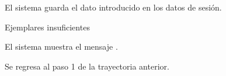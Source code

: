 {\begin{trayectoriaAlternativa}
    \item El sistema guarda el dato introducido en los datos de sesión.

  \end{trayectoriaAlternativa}


  \begin{trayectoriaAlternativa}
    {Ejemplares insuficientes}

    \item El sistema muestra el mensaje
      .

    \item Se regresa al paso 1 de la trayectoria
      anterior.

  \end{trayectoriaAlternativa}
}
